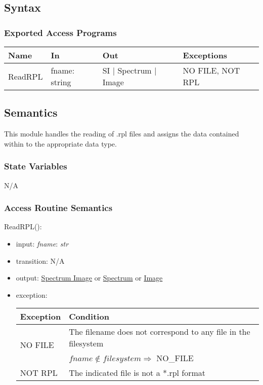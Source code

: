 \documentclass[12pt, titlepage]{article}
\begin{document}
\subsection{Syntax}

\subsubsection{Exported Access Programs}

\begin{center}
    \begin{tabular}{p{2cm} p{4cm} p{4cm} p{2cm}}
        \hline
        \textbf{Name} & \textbf{In} & \textbf{Out} & \textbf{Exceptions} \\
        \hline
        ReadRPL & fname: string & SI $|$ Spectrum $|$ Image & NO FILE, NOT RPL \\
        \hline
    \end{tabular}
\end{center}

\subsection{Semantics}
This module handles the reading of .rpl files and assigns the data contained
within to the appropriate data type.

\subsubsection{State Variables}
N/A

\subsubsection{Access Routine Semantics}

\noindent ReadRPL():
\begin{itemize}
    \item input: \textit{fname}: \textit{str}
    \item transition: N/A
    \item output: \hyperref[Mod:SI]{Spectrum Image} or
    \hyperref[Mod:Spectrum]{Spectrum} or \hyperref[Mod:Image]{Image}
    \item exception: 
    \begin{center}
        \begin{tabular}{p{3cm} p{12cm}}
            \toprule[0.15em]
            \textbf{Exception} & \textbf{Condition}\\
            \midrule[0.1em]
            \multirow{2}{0.25\textwidth}{NO FILE} & The filename does not
            correspond to any file in the filesystem\\ 
            & $fname \notin filesystem \Rightarrow$ NO\_FILE\\ 
            \midrule[0.05em]
            NOT RPL & The indicated file is not a *.rpl format\\
            \bottomrule[0.15em]
        \end{tabular}
    \end{center}
\end{itemize}
\end{document}
